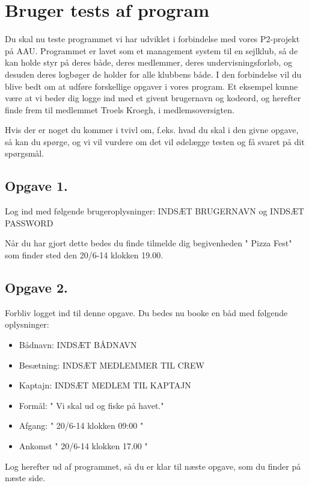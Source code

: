 \chapter{Bruger tests af program}\label{BrugerTestCases}
\cbstart
Du skal nu teste programmet vi har udviklet i forbindelse med vores P2-projekt på AAU. Programmet er lavet som et management system til en sejlklub, så de kan holde styr på deres både, deres medlemmer, deres undervisningsforløb, og desuden deres logbøger de holder for alle klubbens både. I den forbindelse vil du blive bedt om at udføre forskellige opgaver i vores program. Et eksempel kunne være at vi beder dig logge ind med et givent brugernavn og kodeord, og herefter finde frem til medlemmet Troels Kroegh, i medlemsoversigten.

Hvis der er noget du kommer i tvivl om, f.eks. hvad du skal i den givne opgave, så kan du spørge, og vi vil vurdere om det vil ødelægge testen og få svaret på dit spørgsmål.


\section{Opgave 1.}

Log ind med følgende brugeroplysninger: INDSÆT BRUGERNAVN og INDSÆT PASSWORD

Når du har gjort dette bedes du finde tilmelde dig begivenheden " Pizza Fest" som finder sted den 20/6-14  klokken 19.00.

\section{Opgave 2.}

Forbliv logget ind til denne opgave. Du bedes nu booke en båd med følgende oplysninger:

\begin{itemize}
	\item Bådnavn: INDSÆT BÅDNAVN
	\item Besætning: INDSÆT MEDLEMMER TIL CREW
	\item Kaptajn: INDSÆT MEDLEM TIL KAPTAJN
	\item Formål: " Vi skal ud og fiske på havet."
	\item Afgang: " 20/6-14 klokken 09:00 " 
	\item Ankomst " 20/6-14 klokken 17.00 "
\end{itemize}

Log herefter ud af programmet, så du er klar til næste opgave, som du finder på næste side.

